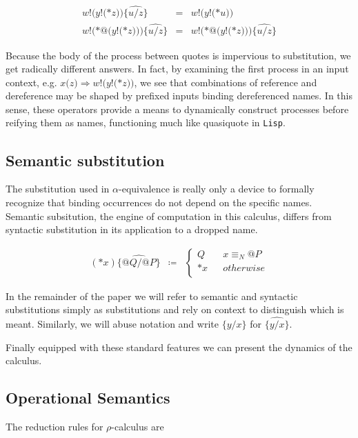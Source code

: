 \documentclass[]{amsart}
\makeatletter
\newcommand{\id}[1]{\texttt{#1}}
\newcommand{\juxtap}{\mathbin{\id{|}}}
\newcommand{\concat}{\Rightarrow}
\newcommand{\nameeq}{\mathbin{\equiv_N}}
\newcommand{\quotep}[1]{@#1}
\newcommand{\dropn}[1]{*#1}
\newcommand{\substp}[2]{\id{\{} \quotep{#1} / \quotep{#2} \id{\}}}
\newcommand{\substn}[2]{\id{\{} #1 / #2 \id{\}}}
\newcommand{\psubstp}[2]{\widehat{\substp{#1}{#2}}}
\newcommand{\psubstn}[2]{\widehat{\substn{#1}{#2}}}
\newcommand{\defneqls}{\coloneqq}
\newcommand{\red}{\rightarrow}
\theoremstyle{definition}
\theoremstyle{remark}
\numberwithin{equation}{subsection}
\newcommand{\rhoc}{$\rho$-calculus}
\makeatother
\begin{document}
\begin{eqnarray*}
	{w}{!}{(}{y}{!}{(}{*}{z}{)}{)}\widehat{{\{}u / z{\}}}
		& = &
		{w}{!}{(}{y}{!}{(}{*}u{)}{)} \\
        {w}{!}{(}{*}{@}({y}{!}{(}{*z}{)}{)}{)}\widehat{{\{}u / z{\}} }
		& = &
		{w}{!}{(}{*}{@}({y}{!}{(}{*z}{)}{)}{)}\widehat{{\{}u / z{\}} }
\end{eqnarray*}

Because the body of the process between quotes is impervious to
substitution, we get radically different answers. In fact, by
examining the first process in an input context, e.g. $x{(}{z}{)}
\Rightarrow {w}{!}{(}{y}{!}{(}{*}{z}{)}{)}$, we see that combinations
of reference and dereference may be shaped by prefixed inputs binding
dereferenced names. In this sense, these operators provide a means to
dynamically construct processes before reifying them as names,
functioning much like quasiquote in \texttt{Lisp}.

\subsection{Semantic substitution}

The substitution used in $\alpha$-equivalence is really only a device
to formally recognize that binding occurrences do not depend on the
specific names. Semantic subsitution, the engine of computation in
this calculus, differs from syntactic substitution in its application
to a dropped name.

\begin{eqnarray*}
(\dropn{x})  \psubstp{Q}{P}       
		& \defneqls & 
		\left\{ 
			\begin{array}{ccc} 
				Q & & x \nameeq \quotep{P} \\
                              	\dropn{x} & & otherwise \\
			\end{array}
		\right.
\end{eqnarray*}

In the remainder of the paper we will refer to semantic and syntactic
substitutions simply as substitutions and rely on context to
distinguish which is meant. Similarly, we will abuse notation and
write $\substn{y}{x}$ for $\psubstn{y}{x}$.

Finally equipped with these standard features we can present the
dynamics of the calculus.

\subsection{Operational Semantics}
The reduction rules for {\rhoc}  are
\end{document}
